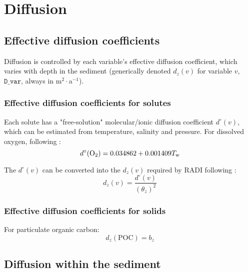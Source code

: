 \documentclass[a4paper]{article}
\newcommand{\code}[1]{\texttt{#1}}
\begin{document}

\section{Diffusion}\label{sx:diffusion}

\subsection{Effective diffusion coefficients}

Diffusion is controlled by each variable's effective diffusion coefficient, which varies with depth in the sediment (generically denoted $d_z(v)$ for variable $v$, $\code{D\_var}$, always in m$^2\cdot$a$^{-1}$).


\subsubsection{Effective diffusion coefficients for solutes}

Each solute has a "free-solution" molecular/ionic diffusion coefficient $d^\circ(v)$, which can be estimated from temperature, salinity and pressure. For dissolved oxygen, following \citet{li_diffusion_1974}:
\begin{equation}
d^\circ(\ce{O2}) = 0.034862 + 0.001409 T_\mathrm{w}
\end{equation}

The $d^\circ(v)$ can be converted into the $d_z(v)$ required by RADI following \citet{boudreau_method--lines_1996}:
\begin{equation}
d_z(v) = \frac{d^\circ(v)}{(\theta_z)^2}
\end{equation}


\subsubsection{Effective diffusion coefficients for solids}

For particulate organic carbon:
\begin{equation}
d_z(\mathrm{POC}) = b_z
\end{equation}


\subsection{Diffusion within the sediment}
\end{document}
